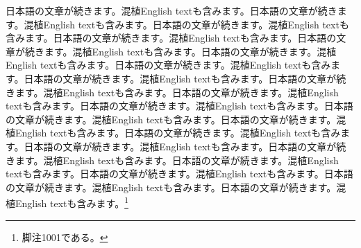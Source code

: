 \documentclass[pdflatex,book]{jlreq}
\begin{document}
日本語の文章が続きます。混植English textも含みます。日本語の文章が続きます。混植English textも含みます。日本語の文章が続きます。混植English textも含みます。日本語の文章が続きます。混植English textも含みます。日本語の文章が続きます。混植English textも含みます。日本語の文章が続きます。混植English textも含みます。日本語の文章が続きます。混植English textも含みます。日本語の文章が続きます。混植English textも含みます。日本語の文章が続きます。混植English textも含みます。日本語の文章が続きます。混植English textも含みます。日本語の文章が続きます。混植English textも含みます。日本語の文章が続きます。混植English textも含みます。日本語の文章が続きます。混植English textも含みます。日本語の文章が続きます。混植English textも含みます。日本語の文章が続きます。混植English textも含みます。日本語の文章が続きます。混植English textも含みます。日本語の文章が続きます。混植English textも含みます。日本語の文章が続きます。混植English textも含みます。日本語の文章が続きます。混植English textも含みます。日本語の文章が続きます。混植English textも含みます。\footnote{脚注1001である。}
\end{document}
